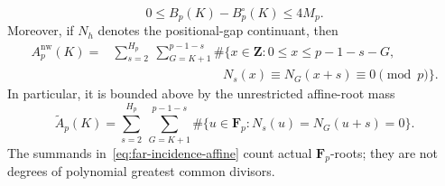 \begin{proposition}
\begin{equation}
 0\le B_p(K)-B_p^\circ(K)\le4M_p.
\label{eq:far-reflection-baseline}
\end{equation}
Moreover, if $N_h$ denotes the positional-gap continuant, then
\begin{equation}
\begin{split}
 A_p^{\mathrm{nw}}(K)
 ={}&\sum_{s=2}^{H_p}\ \sum_{G=K+1}^{p-1-s}
 \#\bigl\{x\in\mathbf Z:
 0\le x\le p-1-s-G,\\[-2pt]
 &\hspace{105pt}
 N_s(x)\equiv N_G(x+s)\equiv0\pmod p\bigr\}.
\end{split}
\label{eq:far-incidence-continuants}
\end{equation}
In particular, it is bounded above by the unrestricted affine-root mass
\begin{equation}
 \widetilde A_p(K)=
 \sum_{s=2}^{H_p}\ \sum_{G=K+1}^{p-1-s}
 \#\{u\in\mathbf F_p:
       N_s(u)=N_G(u+s)=0\}.
\label{eq:far-incidence-affine}
\end{equation}
The summands in~\eqref{eq:far-incidence-affine} count actual
$\mathbf F_p$-roots; they are not degrees of polynomial greatest common
divisors.
\end{proposition}

